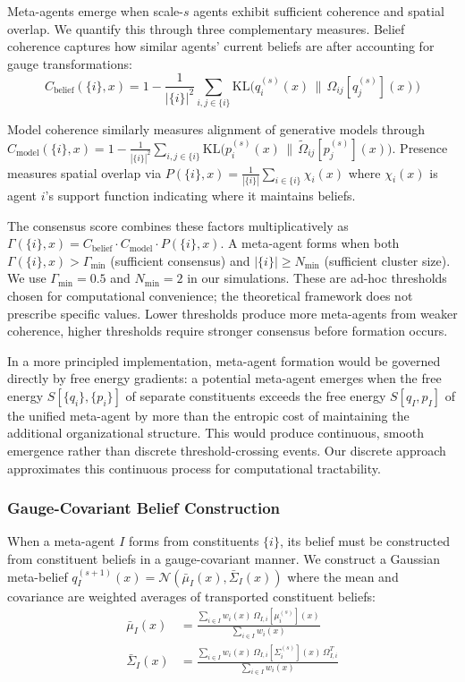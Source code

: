 \documentclass[11pt]{article}
\begin{document}
Meta-agents emerge when scale-$s$ agents exhibit sufficient coherence and spatial overlap. We quantify this through three complementary measures. Belief coherence captures how similar agents' current beliefs are after accounting for gauge transformations:
\begin{equation}
C_{\mathrm{belief}}(\{i\}, x) = 1 - \frac{1}{|\{i\}|^2}\sum_{i,j \in \{i\}} \mathrm{KL}\big(q_i^{(s)}(x) \,\|\, \Omega_{ij}[q_j^{(s)}](x)\big)
\end{equation}

Model coherence similarly measures alignment of generative models through $C_{\mathrm{model}}(\{i\}, x) = 1 - \frac{1}{|\{i\}|^2}\sum_{i,j \in \{i\}} \mathrm{KL}\big(p_i^{(s)}(x) \,\|\, \tilde{\Omega}_{ij}[p_j^{(s)}](x)\big)$. Presence measures spatial overlap via $P(\{i\}, x) = \frac{1}{|\{i\}|}\sum_{i \in \{i\}} \chi_i(x)$ where $\chi_i(x)$ is agent $i$'s support function indicating where it maintains beliefs.

The consensus score combines these factors multiplicatively as $\Gamma(\{i\}, x) = C_{\mathrm{belief}} \cdot C_{\mathrm{model}} \cdot P(\{i\}, x)$. A meta-agent forms when both $\Gamma(\{i\}, x) > \Gamma_{\min}$ (sufficient consensus) and $|\{i\}| \geq N_{\min}$ (sufficient cluster size). We use $\Gamma_{\min} = 0.5$ and $N_{\min} = 2$ in our simulations. These are ad-hoc thresholds chosen for computational convenience; the theoretical framework does not prescribe specific values. Lower thresholds produce more meta-agents from weaker coherence, higher thresholds require stronger consensus before formation occurs.

In a more principled implementation, meta-agent formation would be governed directly by free energy gradients: a potential meta-agent emerges when the free energy $S[\{q_i\}, \{p_i\}]$ of separate constituents exceeds the free energy $S[q_I, p_I]$ of the unified meta-agent by more than the entropic cost of maintaining the additional organizational structure. This would produce continuous, smooth emergence rather than discrete threshold-crossing events. Our discrete approach approximates this continuous process for computational tractability.

\subsubsection{Gauge-Covariant Belief Construction}

When a meta-agent $I$ forms from constituents $\{i\}$, its belief must be constructed from constituent beliefs in a gauge-covariant manner. We construct a Gaussian meta-belief $q_I^{(s+1)}(x) = \mathcal{N}(\bar{\mu}_I(x), \bar{\Sigma}_I(x))$ where the mean and covariance are weighted averages of transported constituent beliefs:
\begin{align}
\bar{\mu}_I(x) &= \frac{\sum_{i \in I} w_i(x) \, \Omega_{I,i}[\mu_i^{(s)}](x)}{\sum_{i \in I} w_i(x)} \\
\bar{\Sigma}_I(x) &= \frac{\sum_{i \in I} w_i(x) \, \Omega_{I,i}[\Sigma_i^{(s)}](x) \, \Omega_{I,i}^T}{\sum_{i \in I} w_i(x)}
\end{align}
\end{document}
